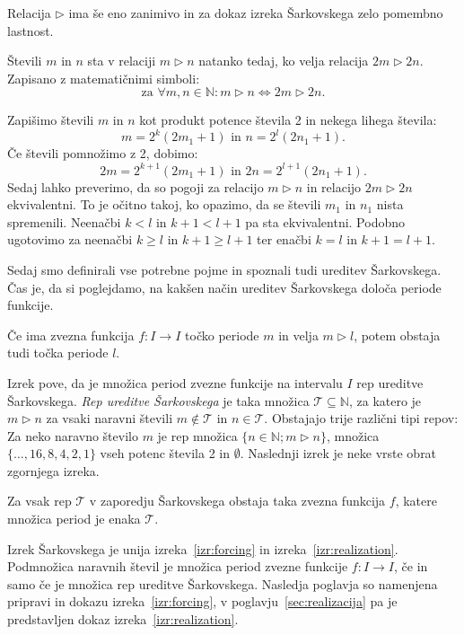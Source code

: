 \documentclass[mat2]{fmfdelo}
\newcommand{\N}{\mathbb N}
\begin{document}
Relacija $\triangleright$ ima še eno zanimivo in za dokaz izreka Šarkovskega zelo pomembno lastnost.
\begin{trditev}\label{trd:doubling}
Števili $m$ in $n$ sta v relaciji $m \triangleright n$ natanko tedaj, ko velja relacija $2m \triangleright 2n$. Zapisano z matematičnimi simboli:
$$\text{za } \forall m, n \in \N: m \triangleright n \Leftrightarrow 2m \triangleright 2n.$$
\end{trditev}
\begin{dokaz}
Zapišimo števili $m$ in $n$ kot produkt potence števila 2 in nekega lihega števila:
$$m= 2^k(2m_1 +1)\text{ in } n= 2^l(2n_1 +1).$$
Če števili pomnožimo z 2, dobimo:
$$2m= 2^{k+1}(2m_1 +1)\text{ in } 2n= 2^{l+1}(2n_1 +1).$$
Sedaj lahko preverimo, da so pogoji za relacijo $m \triangleright n$ in relacijo $2m \triangleright 2n$ ekvivalentni. To je očitno takoj, ko opazimo, da se števili $m_1$ in $n_1$ nista spremenili. Neenačbi $k<l$ in $k+1<l+1$ pa sta ekvivalentni. Podobno ugotovimo za neenačbi $k \geq l$ in $k+1 \geq l+1$ ter enačbi $k=l$ in $k+1 = l+1$.
\end{dokaz}

Sedaj smo definirali vse potrebne pojme in spoznali tudi ureditev Šarkovskega. Čas je, da si poglejdamo, na kakšen način ureditev Šarkovskega določa periode funkcije.

\begin{izrek}\label{izr:forcing}
Če ima zvezna funkcija $f : I \to I$ točko periode $m$ in velja $ m \triangleright l$, potem obstaja tudi točka periode $l$.
\end{izrek}
Izrek pove, da je množica period zvezne funkcije na intervalu $I$ rep ureditve Šarkovskega. \emph{Rep ureditve Šarkovskega} je taka množica $\mathcal{T} \subseteq \N$, za katero je $m \triangleright n$ za  vsaki naravni števili $m \notin \mathcal{T}$ in $n \in \mathcal{T}$. Obstajajo trije različni tipi repov:  Za neko naravno število $m$ je rep množica $\{n \in \N; m \triangleright n\}$, množica $\{\dots, 16, 8, 4, 2, 1\}$ vseh potenc števila 2 in $\emptyset$.
Naslednji izrek je neke vrste obrat zgornjega izreka.

\begin{izrek}\label{izr:realization}
Za vsak rep $\mathcal{T}$ v zaporedju Šarkovskega obstaja taka zvezna funkcija $f$, katere množica period je enaka $\mathcal{T}$.
\end{izrek}

Izrek Šarkovskega je unija izreka~\ref{izr:forcing} in izreka~\ref{izr:realization}. Podmnožica naravnih števil je množica period zvezne funkcije $f:I \to I$, če in samo če je množica rep ureditve Šarkovskega. Nasledja poglavja so namenjena pripravi in dokazu izreka~\ref{izr:forcing}, v poglavju~\ref{sec:realizacija} pa je predstavljen dokaz izreka~\ref{izr:realization}.
\end{document}
